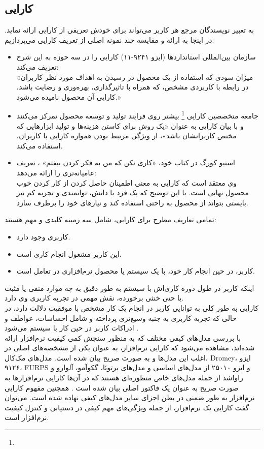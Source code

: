 \documentclass{article}
\theoremstyle{definition}
\begin{document}
	\subsection{کارایی}
به تعبیر نویسندگان مرجع
\cite{measuring}
هر کاربر می‌تواند برای خودش تعریفی از کارایی ارائه نماید. در اینجا به ارائه و مقایسه چند نمونه اصلی از تعریف کارایی می‌پردازیم:
\begin{itemize}
	\item
	سازمان بین‌المللی استانداردها (ایزو ۹۲۴۱-۱۱) کارایی را در سه حوزه به این شرح  تعریف می‌کند:\\
	«میزان سودی که استفاده از یک محصول در رسیدن به اهداف مورد نظر کاربران در رابطه با کاربردی مشخص، که همراه با تاثیرگذاری، بهره‌وری و رضایت باشد، کارایی آن محصول نامیده می‌شود.»
	\item 
	جامعه متخصصین کارایی
	\footnote{}
	بیشتر روی فرایند تولید و توسعه محصول تمرکز می‌کنند و با بیان کارایی به عنوان «یک روش برای کاستن هزینه‌ها و تولید ابزارهایی که مختص کاربرانشان باشد»، از ویژگی مرتبط بودن همواره کارایی با کاربران، استفاده می‌کند.
	\item 
	استیو کورگ در کتاب خود، «کاری نکن که من به فکر کردن بیفتم»
	\cite{don't make me think}،
	تعریف عامیانه‌تری را ارائه می‌دهد:\\
	وی معتقد است که کارایی به معنی اطمینان حاصل کردن از کار کردن خوب محصول نهایی است. با این توضیح که یک فرد با دانش، توانمندی و تجربه کم نیز بایستی بتواند از محصول به راحتی استفاده کند و نیازهای خود را برطرف سازد.
\end{itemize}
تمامی تعاریف مطرح برای کارایی، شامل سه زمینه کلیدی و مهم هستند:
\begin{itemize}
	\item کاربری وجود دارد.
	\item این کاربر مشغول انجام کاری است.
	\item کاربر، در حین انجام کار خود، با یک سیستم یا محصول نرم‌افزاری در تعامل است.
\end{itemize}
اینکه کاربر در طول دوره کاری‌اش با سیستم به طور دقیق به چه موارد منفی یا مثبت یا حتی خنثی برخورده، نقش مهمی در تجربه کاربری وی دارد. \\
کارایی به طور کلی به توانایی کاربر در انجام یک کار مشخص با موفقیت دلالت دارد، در حالی که تجربه کاربری به جنبه وسیع‌تری پرداخته و شامل احساسات، عواطف و ادراکات کاربر در حین کار با سیستم می‌شود
\cite{measuring}.\\
با بررسی مدل‌های کیفی مختلف که به منظور سنجش کمی کیفیت نرم‌افزار ارائه شده‌اند، مشاهده می‌شود که کارایی نرم‌افزار، به عنوان یکی از مشخصه‌های اصلی در اغلب این مدل‌ها و به صورت صریح  بیان شده است. مدل‌های مک‌کال، Dromey، ایزو ۹۱۲۶، FURPS و ایزو ۲۵۰۱۰ از مدل‌های اساسی و مدل‌های برتوئا، گکوآمو، آلوارو و راواشد از جمله مدل‌های خاص منظوره‌ای هستند که در آن‌ها کارایی نرم‌افزارها به صورت صریح به عنوان یک فاکتور اصلی بیان شده است 
\cite{pressman}.
همچنین مفهوم کارایی نرم‌افزار به طور ضمنی در بطن اجزای سایر مدل‌های کیفی نهاده شده است. می‌توان گفت کارایی یک نرم‌افزار، از جمله ویژگی‌های مهم کیفی در دستیابی و کنترل کیفیت نرم‌افزار است.
\end{document}
